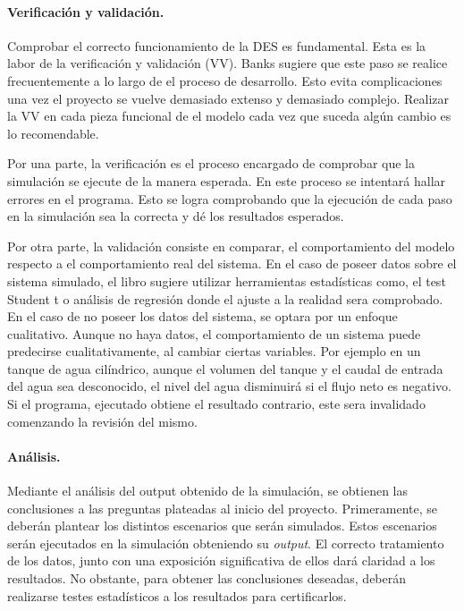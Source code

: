 \paragraph{Verificación y validación.}

Comprobar el correcto funcionamiento de la DES es fundamental.
Esta es la labor de la verificación y validación (VV).
Banks sugiere que este paso se realice
frecuentemente a lo largo de el proceso de desarrollo.
Esto evita complicaciones una vez el proyecto se vuelve demasiado extenso y demasiado complejo.
Realizar la VV en cada pieza funcional de el modelo
cada vez que suceda algún cambio es lo recomendable.

Por una parte, la verificación es el proceso encargado de
comprobar que la simulación se ejecute de la manera esperada.
En este proceso se intentará hallar errores en el programa.
Esto se logra comprobando que la ejecución de cada paso
en la simulación sea la correcta y dé los resultados esperados.

Por otra parte, la validación consiste en comparar,
el comportamiento del modelo respecto a el comportamiento real del sistema.
En el caso de poseer datos sobre el sistema simulado,
el libro sugiere utilizar herramientas estadísticas como, el test Student t o
análisis de regresión donde el ajuste a la realidad sera comprobado.
En el caso de no poseer los datos del sistema, se optara por un enfoque cualitativo.
Aunque no haya datos, el comportamiento de un sistema
puede predecirse cualitativamente, al cambiar ciertas variables.
Por ejemplo en un tanque de agua cilíndrico,
aunque el volumen del tanque y el caudal de entrada del agua sea desconocido,
el nivel del agua disminuirá si el flujo neto es negativo.
Si el programa, ejecutado obtiene el resultado contrario,
este sera invalidado comenzando la revisión del mismo.

\paragraph{Análisis.}

Mediante el análisis del output obtenido de la simulación,
se obtienen las conclusiones a las preguntas plateadas al inicio del proyecto.
Primeramente, se deberán plantear los distintos escenarios que serán simulados.
Estos escenarios serán ejecutados en la simulación
obteniendo su \textit{output}.
El correcto tratamiento de los datos, junto con una exposición significativa de ellos dará claridad a los resultados.
No obstante, para obtener las conclusiones deseadas, deberán realizarse testes estadísticos a los resultados para certificarlos.

